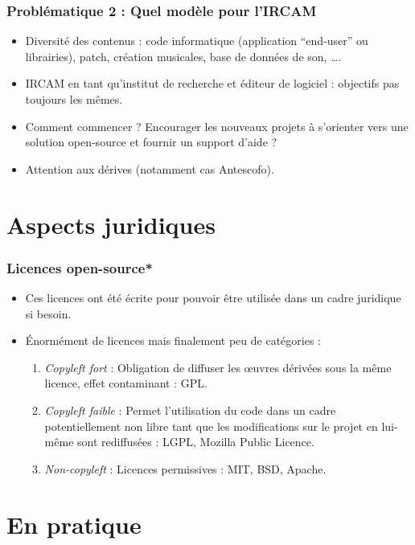 \documentclass[xcolor=dvipsnames]{beamer}
\begin{document}
\begin{frame}
\frametitle{Problématique 2 : Quel modèle pour l'IRCAM}

\begin{itemize}
\item Diversité des contenus : code informatique (application ``end-user'' ou librairies), patch, création musicales, base de données de son, \ldots.
\item IRCAM en tant qu'institut de recherche et éditeur de logiciel : objectifs pas toujours les mêmes.
\item Comment commencer ? Encourager les nouveaux projets à s'orienter vers une solution open-source et fournir un support d'aide ?
\item Attention aux dérives (notamment cas Antescofo).
\end{itemize}
\end{frame}

\section{Aspects juridiques}

\begin{frame}
\frametitle{Licences open-source*}

\begin{itemize}
\item Ces licences ont été écrite pour pouvoir être utilisée dans un cadre juridique si besoin.
\item Énormément de licences mais finalement peu de catégories :
  \begin{enumerate}
    \item \textit{Copyleft fort} : Obligation de diffuser les œuvres dérivées sous la même licence, effet contaminant : GPL.
    \item \textit{Copyleft faible} : Permet l'utilisation du code dans un cadre potentiellement non libre tant que les modifications sur le projet en lui-même sont rediffusées : LGPL, Mozilla Public Licence.
    \item \textit{Non-copyleft} : Licences permissives : MIT, BSD, Apache.
  \end{enumerate}
\end{itemize}

\end{frame}

\section{En pratique}
\end{document}

